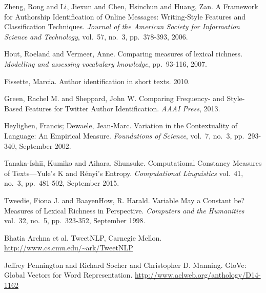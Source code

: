 \documentclass[journal, a4paper, 12pt]{IEEEtran}
\begin{document}
\begin{thebibliography}{2}

	Zheng, Rong and Li, Jiexun and Chen, Hsinchun and Huang, Zan. A Framework for Authorship Identification
	of Online Messages: Writing-Style Features and Classification Techniques. {\em Journal of the American
	Society for Information Science and Technology},
	vol.~57, no.~3, pp.~378-393, 2006.

	Hout, Roeland and Vermeer, Anne. Comparing measures of lexical richness. {\em Modelling and assessing vocabulary 
	knowledge}, pp.~93-116, 2007.

	Fissette, Marcia. Author identification in short texts. 2010.

	Green, Rachel M. and Sheppard, John W. Comparing Frequency- and Style-Based Features for Twitter
	Author Identification. {\em AAAI Press}, 2013.
	
	Heylighen, Francis; Dewaele, Jean-Marc. Variation in the Contextuality of Language: An Empirical Measure.
	{\em Foundations of Science}, vol.~7, no.~3, pp.~293-340, September 2002.

	Tanaka-Ishii, Kumiko and Aihara, Shunsuke. Computational Constancy Measures of Texts—Yule's K and Rényi's Entropy.
	{\em Computational Linguistics} vol.~41, no.~3, pp.~481-502, September 2015.

	Tweedie, Fiona J. and BaayenHow, R. Harald. Variable May a Constant be? Measures of Lexical Richness in Perspective.
	{\em Computers and the Humanities} vol.~32, no.~5, pp.~323-352, September 1998.	

	Bhatia Archna et al. TweetNLP, Carnegie Mellon. \url{http://www.cs.cmu.edu/~ark/TweetNLP}
	
	Jeffrey Pennington and Richard Socher and Christopher D. Manning. GloVe: Global Vectors for Word Representation. \url{http://www.aclweb.org/anthology/D14-1162}

\end{thebibliography}
\end{document}
